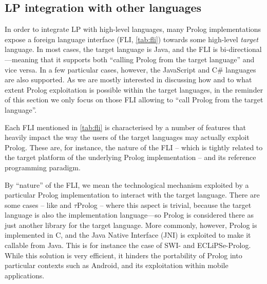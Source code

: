\documentclass[12pt,a4paper,openright,twoside]{book}
\begin{document}
\subsection{LP integration with other languages}

%
In order to integrate LP with high-level languages, many Prolog implementations expose a foreign language interface (FLI, \cref{tab:fli}) towards some high-level \emph{target} language.
%
In most cases, the target language is Java, and the FLI is bi-directional---meaning that it supports both ``calling Prolog from the target language'' and vice versa.
%
In a few particular cases, however, the JavaScript and C\# languages are also supported.
%
As we are mostly interested in discussing how and to what extent Prolog exploitation is  possible within the target languages, in the reminder of this section we only focus on those FLI allowing to ``call Prolog from the target language''.

Each FLI mentioned in \cref{tab:fli} is characterised by a number of features that heavily impact the way the users of the target languages may actually exploit Prolog.
%
These are, for instance, the nature of the FLI -- which is tightly related to the target platform of the underlying Prolog implementation -- and its reference programming paradigm.

By ``nature'' of the FLI, we mean the technological mechanism exploited by a particular Prolog implementation to interact with the target language.
%
There are some cases -- like \tuprolog{} and $\tau$Prolog -- where this aspect is trivial, because the target language is also the implementation language---so Prolog is considered there as just another library for the target language.
%
More commonly, however, Prolog is implemented in C, and the Java Native Interface (JNI) is exploited to make it callable from Java.
%
This is for instance the case of SWI- and ECLiPSe-Prolog.
%
While this solution is very efficient, it hinders the portability of Prolog into particular contexts such as Android, and its exploitation within mobile applications.


\end{document}
